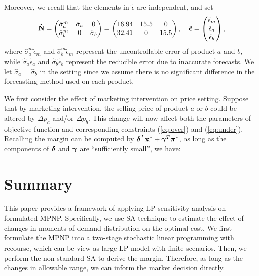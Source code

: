 \documentclass[a4paper,11pt]{article}
\begin{document}
Moreover, we recall that the elements in \mbox{\boldmath$\tilde{\epsilon}$} are independent, and set
\[
\mathbf{\hat{N}} = 
\begin{pmatrix}
\hat{\sigma}_a^m&\hat{\sigma}_a&0\\
\hat{\sigma}_b^m&0&\hat{\sigma}_b\\
\end{pmatrix} =
\begin{pmatrix}
16.94&15.5&0\\
32.41&0&15.5\\
\end{pmatrix}
,\quad \mbox{\boldmath$\tilde{\epsilon}$} = 
\begin{pmatrix}
\tilde{\epsilon}_m\\
\tilde{\epsilon}_a\\
\tilde{\epsilon}_b
\end{pmatrix},
\]
where $\hat{\sigma}_a^m \tilde{\epsilon}_m$ and $\hat{\sigma}_b^m \tilde{\epsilon}_m$ represent the uncontrollable error of product $a$ and $b$, while $\hat{\sigma}_a \tilde{\epsilon}_a$ and $\hat{\sigma}_b \tilde{\epsilon}_b$
represent the reducible error due to inaccurate forecasts. We let $\hat{\sigma}_a = \hat{\sigma}_b$ in the setting since we assume there is no significant difference in the forecasting method used on each product.

We first consider the effect of marketing intervention on price setting. Suppose that by marketing intervention, the selling price of product $a$ or $b$ could be altered by $\Delta p_a$ and/or $\Delta p_b$. This change will now affect both the parameters of objective function and corresponding constraints (\ref{eq:over}) and (\ref{eq:under}). Recalling the margin can be computed by $\mbox{\boldmath$\delta$}^T \mathbf{x}^* + \mbox{\boldmath$\gamma$}^T \mbox{\boldmath$\pi$}^*$,
as long as the components of $\mbox{\boldmath$\delta$}$ and $\mbox{\boldmath$\gamma$}$
are ``sufficiently small”, we have: 


\section{Summary}
\label{se:conclusion}
This paper provides a framework of applying LP sensitivity analysis on formulated MPNP. Specifically, we use SA technique to estimate the effect of changes in moments of demand distribution on the optimal cost. We first formulate the MPNP into a two-stage stochastic linear programming with recourse, which can be view as large LP model with finite scenarios. Then, we perform the non-standard SA to derive the margin. Therefore, as long as the changes in allowable range, we can inform the market decision directly.
\end{document}

